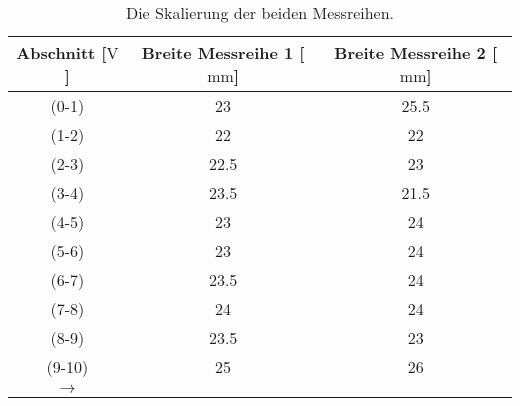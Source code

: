 \begin{table}[H]
  \centering
  \caption{Die Skalierung der beiden Messreihen.}
  \label{tab:skalierungausw}
    \begin{tabular}{S S S}
      \toprule
      {Abschnitt [$\si{\volt}$]} & {Breite Messreihe 1 [$\si{\milli\meter}$]} & {Breite Messreihe 2 [$\si{\milli\meter}$]} \\
      \midrule
      {(0-1)}  &  23   & 25.5  \\
      {(1-2)}  &  22   & 22  \\
      {(2-3)}  &  22.5 & 23  \\
      {(3-4)}  &  23.5 & 21.5  \\
      {(4-5)}  &  23   & 24  \\
      {(5-6)}  &  23   & 24  \\
      {(6-7)}  &  23.5 & 24  \\
      {(7-8)}  &  24   & 24  \\
      {(8-9)}  &  23.5 & 23  \\
      {(9-10)} &  25   & 26  \\
      {$\rightarrow$} & & \\
      \bottomrule
    \end{tabular}
  \end{table}
